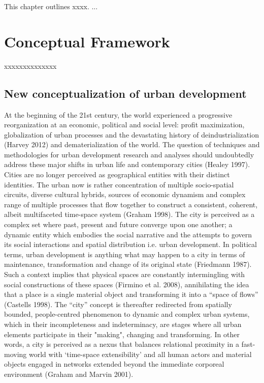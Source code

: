 \documentclass[11pt]{report}
\begin{document}

This chapter outlines xxxx. ...

\section{Conceptual Framework}

xxxxxxxxxxxxxx

\subsection{New conceptualization of urban development}

At the beginning of the 21st century, the world experienced a progressive reorganization at an economic, political and social level: profit maximization, globalization of urban processes and the devastating history of deindustrialization (Harvey 2012) and dematerialization of the world. The question of techniques and methodologies for urban development research and analyses should undoubtedly address these major shifts in urban life and contemporary cities (Healey 1997). 
\\
Cities are no longer perceived as geographical entities with their distinct identities. The urban now is rather concentration of multiple socio-spatial circuits, diverse cultural hybrids, sources of economic dynamism and complex range of multiple processes that flow together to construct a consistent, coherent, albeit multifaceted time-space system (Graham 1998). The city is perceived as a complex set where past, present and future converge upon one another; a dynamic entity which embodies the social narrative and the attempts to govern its social interactions and spatial distribution i.e. urban development. In political terms, urban development is anything what may happen to a city in terms of maintenance, transformation and change of its original state (Friedmann 1987). Such a context implies that physical spaces are constantly intermingling with social constructions of these spaces (Firmino et al. 2008), annihilating the idea that a place is a single material object and transforming it into a “space of flows” (Castells 1998). The “city” concept is thereafter redirected from spatially bounded, people-centred phenomenon to dynamic and complex urban systems, which in their incompleteness and indeterminacy, are stages where all urban elements participate in their "making", changing and transforming. In other words, a city is perceived as a nexus that balances relational proximity in a fast-moving world with ‘time-space extensibility’ and all human actors and material objects engaged in networks extended beyond the immediate corporeal environment (Graham and Marvin 2001). 
\end{document}
